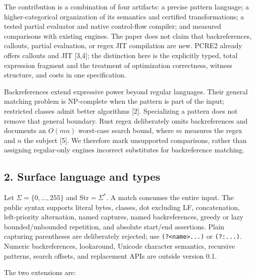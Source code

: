 \documentclass[
  11pt,
]{article}
\newenvironment{Shaded}{}{}
\newcommand{\NormalTok}[1]{#1}
\begin{document}
The contribution is a combination of four artifacts: a precise pattern
language; a higher-categorical organization of its semantics and
certified transformations; a tested partial evaluator and native
control-flow compiler; and measured comparisons with existing engines.
The paper does not claim that backreferences, callouts, partial
evaluation, or regex JIT compilation are new. PCRE2 already offers
callouts and JIT {[}3,4{]}; the distinction here is the explicitly
typed, total expression fragment and the treatment of optimization
correctness, witness structure, and costs in one specification.

Backreferences extend expressive power beyond regular languages. Their
general matching problem is NP-complete when the pattern is part of the
input; restricted classes admit better algorithms {[}2{]}. Specializing
a pattern does not remove that general boundary. Rust regex deliberately
omits backreferences and documents an \(O(mn)\) worst-case search bound,
where \(m\) measures the regex and \(n\) the subject {[}5{]}. We
therefore mark unsupported comparisons, rather than assigning
regular-only engines incorrect substitutes for backreference matching.

\hypertarget{surface-language-and-types}{%
\subsection{2. Surface language and
types}\label{surface-language-and-types}}

Let \(\Sigma=\{0,\ldots,255\}\) and \(\mathrm{Str}=\Sigma^*\). A match
consumes the entire input. The public syntax supports literal bytes,
classes, dot excluding LF, concatenation, left-priority alternation,
named captures, named backreferences, greedy or lazy bounded/unbounded
repetition, and absolute start/end assertions. Plain capturing
parentheses are deliberately rejected; use
\texttt{(?\textless{}name\textgreater{}...)} or \texttt{(?:...)}.
Numeric backreferences, lookaround, Unicode character semantics,
recursive patterns, search offsets, and replacement APIs are outside
version 0.1.

The two extensions are:

\begin{Shaded}
\end{Shaded}
\end{document}
